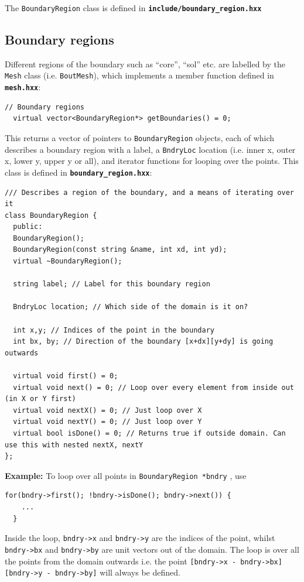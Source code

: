 \documentclass[12pt]{article}
\newcommand{\code}[1]{\texttt{#1}}
\newcommand{\file}[1]{\texttt{\bf #1}}
\begin{document}
The \lstinline!BoundaryRegion! class is defined in \file{include/boundary\_region.hxx}
\subsection{Boundary regions}
\label{sec:BoundaryRegion}

Different regions of the boundary such as ``core'', ``sol'' etc. are
labelled by the \code{Mesh} class (i.e. \code{BoutMesh}), which
implements a member function defined in \file{mesh.hxx}:
\begin{lstlisting}[firstnumber=150]
  // Boundary regions
  virtual vector<BoundaryRegion*> getBoundaries() = 0;
\end{lstlisting}
This returns a vector of pointers to \code{BoundaryRegion} objects,
each of which describes a boundary region with a label, a \code{BndryLoc}
location (i.e. inner x, outer x, lower y, upper y or all), and iterator
functions for looping over the points. This class is
defined in \file{boundary\_region.hxx}:
\begin{lstlisting}[firstnumber=12]
/// Describes a region of the boundary, and a means of iterating over it
class BoundaryRegion {
  public:
  BoundaryRegion();
  BoundaryRegion(const string &name, int xd, int yd);
  virtual ~BoundaryRegion();

  string label; // Label for this boundary region

  BndryLoc location; // Which side of the domain is it on?

  int x,y; // Indices of the point in the boundary
  int bx, by; // Direction of the boundary [x+dx][y+dy] is going outwards

  virtual void first() = 0;
  virtual void next() = 0; // Loop over every element from inside out (in X or Y first)
  virtual void nextX() = 0; // Just loop over X
  virtual void nextY() = 0; // Just loop over Y
  virtual bool isDone() = 0; // Returns true if outside domain. Can use this with nested nextX, nextY
};
\end{lstlisting}

{\bf Example:} To loop over all points in \code{BoundaryRegion *bndry} , use
\begin{lstlisting}[numbers=none]
  for(bndry->first(); !bndry->isDone(); bndry->next()) {
    ...
  }
\end{lstlisting}
Inside the loop, \code{bndry->x} and \code{bndry->y} are the indices
of the point, whilst \code{bndry->bx} and \code{bndry->by} are unit vectors
out of the domain. The loop is over all the points from the domain outwards
i.e. the point
\code{[bndry->x - bndry->bx][bndry->y - bndry->by]} will always be defined.
\end{document}
